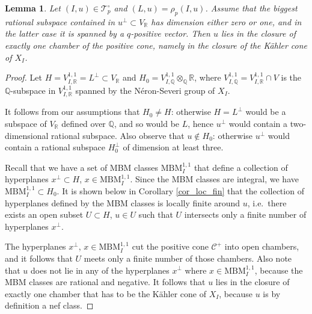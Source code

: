 \documentclass[11pt]{article}
\newcommand{\6}{\partial}
\newcommand{\bbQ}{\mathbb{Q}}
\newcommand{\bbR}{\mathbb{R}}
\newcommand{\CC}{\mathcal{C}}
\newcommand{\Teich}{\mathcal{T}}
\newcommand{\TeichP}{\Teich_p}
\newcommand{\Per}{\rho}
\newcommand{\PerP}{\Per_p}
\newcommand{\MBM}{\mathrm{MBM}}
\newtheorem{lem}[defn]{Lemma}
\begin{document}
\begin{lem}\label{lem_chamber}
Let $(I,u)\in \TeichP^\circ$ and $(L,u) = \PerP(I,u)$. Assume that
the biggest rational subspace contained in $u^\perp\subset V_\bbR$ has dimension either zero or one,
and in the latter case it is spanned by a $q$-positive vector.
Then $u$ lies in the closure of exactly one chamber of the positive cone,
namely in the closure of the K\"ahler cone of $X_I$.
\end{lem}

\begin{proof}
Let $H = V^{1,1}_{I,\bbR} = L^\perp\subset V_\bbR$ and $H_0 = V^{1,1}_{I,\bbQ} \otimes_\bbQ \bbR$, where $V^{1,1}_{I,\bbQ} = V^{1,1}_{I,\bbR} \cap V$
is the $\bbQ$-subspace in $V^{1,1}_{I,\bbR}$ spanned by the N\'eron-Severi group of $X_I$.

It follows from our assumptions that $H_0\neq H$: otherwise $H = L^\perp$ would be a subspace
of $V_\bbR$ defined over $\bbQ$, and so would be $L$, hence $u^\perp$ would contain a two-dimensional
rational subspace. Also observe that $u\notin H_0$: otherwise $u^\perp$ would contain
a rational subspace $H_0^\perp$ of dimension at least three. 

Recall that we have a set of MBM classes $\MBM_I^{1,1}$ that define a collection
of hyperplanes $x^\perp\subset H$, $x\in \MBM_I^{1,1}$. Since the MBM classes are integral,
we have $\MBM_I^{1,1}\subset H_0$. It is shown below in Corollary \ref{cor_loc_fin} that
the collection of hyperplanes defined by the MBM classes is locally finite around $u$,
i.e.\ there exists an open subset $U\subset H$, $u\in U$ such that $U$ intersects
only a finite number of hyperplanes $x^\perp$.

The hyperplanes $x^\perp$, $x\in \MBM_I^{1,1}$ cut the positive
cone $\CC^+$ into open chambers, and it follows that $U$ meets only a finite number
of those chambers. Also note that $u$ does not lie in any of the hyperplanes $x^\perp$ where $x\in \MBM_I^{1,1}$,
because the MBM classes are rational and negative.
It follows that $u$ lies in the closure of exactly
one chamber that has to be the K\"ahler cone of $X_I$, because $u$ is by definition a nef class.
\end{proof}
\end{document}
